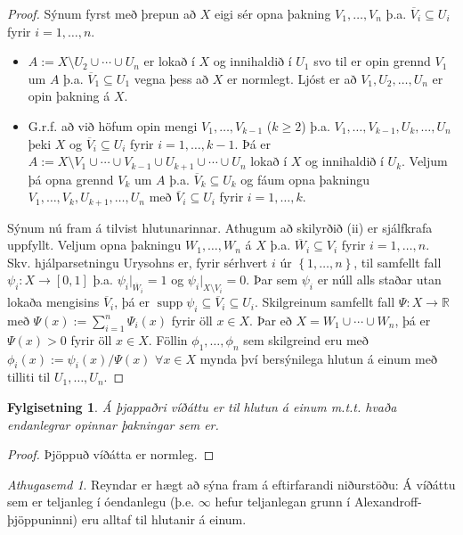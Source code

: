 \documentclass[a4paper,icelandic]{book}
\theoremstyle{definition}
\theoremstyle{plain}
\newtheorem{fylgisetn}{Fylgisetning}[section]
\theoremstyle{remark}
\newtheorem*{ath}{Athugasemd}
\newcommand{\R}{\mathbb{R}} %
\DeclareMathOperator{\supp}{supp} %
\begin{document}
\begin{proof}
  Sýnum fyrst með þrepun að $X$ eigi sér opna þakning $V_1,\dots,V_n$
  þ.a. $\overline V_i\subseteq U_i$ fyrir $i=1,\dots,n$.
  \begin{itemize}
    \item $A := X\setminus U_2\cup\cdots\cup U_n$ er lokað í $X$ og
      innihaldið í $U_1$ svo til er opin grennd $V_1$ um $A$ þ.a.
      $\overline V_1\subseteq U_1$ vegna þess að $X$ er normlegt. Ljóst
      er að $V_1,U_2,\dots,U_n$ er opin þakning á $X$.
    \item G.r.f. að við höfum opin mengi $V_1,\dots,V_{k-1}$ ($k\geq 2$)
      þ.a. $V_1,\dots,V_{k-1},U_k,\dots,U_n$ þeki $X$ og $\overline
      V_i\subseteq U_i$ fyrir $i=1,\dots,k-1$. Þá er $A := X\setminus
      V_1\cup\cdots\cup V_{k-1}\cup U_{k+1}\cup\cdots\cup U_n$ lokað í
      $X$ og innihaldið í $U_k$. Veljum þá opna grennd $V_k$ um $A$ þ.a.
      $\overline V_k\subseteq U_k$ og fáum opna þakningu
      $V_1,\dots,V_k,U_{k+1},\dots,U_n$ með $\overline V_i\subseteq U_i$
      fyrir $i=1,\dots,k$.
  \end{itemize}
  Sýnum nú fram á tilvist hlutunarinnar. Athugum að skilyrðið (ii) er
  sjálfkrafa uppfyllt. Veljum opna þakningu $W_1,\dots,W_n$ á $X$ þ.a.
  $\overline W_i\subseteq V_i$ fyrir $i=1,\dots,n$. Skv. hjálparsetningu
  Urysohns er, fyrir sérhvert $i$ úr $\left\{ 1,\dots,n \right\}$, til
  samfellt fall $\psi_i:X\to\left[ 0,1 \right]$ þ.a. $\psi_i|_{\overline
  W_i} = 1$ og $\psi_i|_{X\setminus V_i} = 0$. Þar sem $\psi_i$ er núll
  alls staðar utan lokaða mengisins $\overline V_i$, þá er
  $\supp\psi_i\subseteq\overline V_i\subseteq U_i$. Skilgreinum samfellt
  fall $\Psi:X\to\R$ með $\Psi(x):=\sum_{i=1}^{n}\Psi_i(x)$ fyrir öll
  $x\in X$. Þar eð $X=W_1\cup\cdots\cup W_n$, þá er $\Psi(x)>0$ fyrir
  öll $x\in X$. Föllin $\phi_1,\dots,\phi_n$ sem skilgreind eru með
  $\phi_i(x) := \psi_i(x)/\Psi(x)$ $\forall x\in X$ mynda því
  bersýnilega hlutun á einum með tilliti til $U_1,\dots,U_n$. 
\end{proof}
\begin{fylgisetn}
  Á þjappaðri víðáttu er til hlutun á einum m.t.t. hvaða endanlegrar opinnar
  þakningar sem er.
\end{fylgisetn}
\begin{proof}
  Þjöppuð víðátta er normleg.
\end{proof}
\begin{ath}
  Reyndar er hægt að sýna fram á eftirfarandi niðurstöðu: Á víðáttu sem
  er teljanleg í óendanlegu (þ.e. $\infty$ hefur teljanlegan grunn í
  Alexandroff-þjöppuninni) eru alltaf til hlutanir á einum.
\end{ath}
\end{document}
